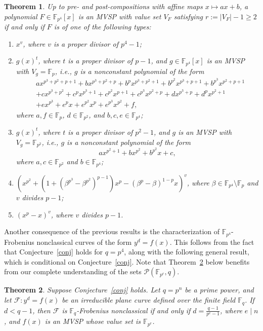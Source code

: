 \documentclass[11pt]{amsart}
\newtheorem{theorem}{Theorem}[section]
\theoremstyle{definition}
\theoremstyle{remark}
\begin{document}
\begin{theorem}\label{thm:p4}
Up to pre- and post-compositions with affine maps $x \mapsto ax + b$, a polynomial $F \in \mathbb{F}_{p^4}[x]$ is an MVSP with value set $V_F$ satisfying $r := |V_F| - 1 \geq 2$ if and only if $F$ is of one of the following types:
\begin{enumerate}[\rm(i)]
\item $x^v$, where $v$ is a proper  divisor of $p^4 - 1$;
\item $g(x)^t$, where $t$ is a proper divisor of $p - 1$, and $g \in \mathbb{F}_{p^4}[x]$ is an MVSP with $V_g = \mathbb{F}_{p}$, i.e., $g$ is a nonconstant polynomial of the form
\begin{align*}
& ax^{p^3+p^2+p+1} + bx^{p^3+p^2+p} + b^p x^{p^3+p^2+1} + b^{p^2} x^{p^3+p+1} + b^{p^3} x^{p^2+p+1} \\
& + cx^{p^3+p^2} + c^p x^{p^3+1} + c^{p^2} x^{p+1} + c^{p^3} x^{p^2+p} + dx^{p^3+p} + d^p x^{p^2+1} \\
& + ex^{p^3} + e^p x + e^{p^2} x^{p} + e^{p^3} x^{p^2} + f,
\end{align*}
where $a, f \in \mathbb{F}_p$, $d \in \mathbb{F}_{p^2}$, and $b, c, e \in \mathbb{F}_{p^4}$;
\item $g(x)^t$, where $t$ is a proper  divisor of $p^2 - 1$, and $g$ is an MVSP with $V_g = \mathbb{F}_{p^2}$, i.e., $g$ is a nonconstant polynomial of the form
$$ax^{p^2+1} + bx^{p^2} + b^{p^2} x + c,$$
 where $a, c \in \mathbb{F}_{p^2}$ and $b \in \mathbb{F}_{p^4}$;
\item $(x^{p^2} + (1 + (\beta^{p^3} - \beta^{p^2})^{p-1})x^p - (\beta^p - \beta)^{1-p}x)^v$, where $\beta \in \mathbb{F}_{p^4} \setminus \mathbb{F}_p$ and $v$ divides $p-1$;
\item $(x^p - x)^v$, where $v$ divides $p-1$.
\end{enumerate}
\end{theorem}

Another consequence of the previous results is the characterization of $\mathbb{F}_{p^4}$-Frobenius nonclassical curves of the form $y^d = f(x)$. This follows from the fact that Conjecture~\ref{conj} holds for $q = p^4$, along with the following general  result, which is conditional on Conjecture~\ref{conj}. Note that Theorem~\ref{FNC} below benefits from our complete understanding of the sets  $\mathcal{P}\left(\mathbb{F}_{p^e}, q\right)$.

\begin{theorem}\label{FNC}
Suppose Conjecture~\ref{conj} holds. Let $q = p^n$ be a prime power, and let $\mathcal{F}: y^d = f(x)$ be an irreducible plane curve defined over the finite field $\mathbb{F}_q$. If $d < q - 1$, then $\mathcal{F}$ is $\mathbb{F}_q$-Frobenius nonclassical if and only if  
$d = \frac{q - 1}{p^e - 1}$, where $e \mid n$, and $f(x)$ is an MVSP whose value set is $\mathbb{F}_{p^e}$.
\end{theorem}
\end{document}
